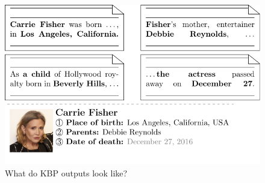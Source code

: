 \begin{figure}[t]
  \includegraphics[width=\columnwidth]{figures/task}
  \caption{\label{fig:task}
  What do KBP outputs look like?
  }
\end{figure}




